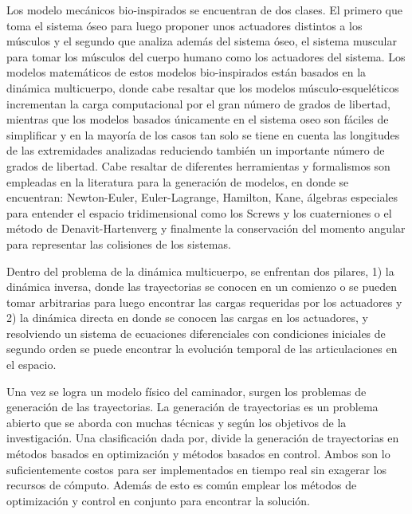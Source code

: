 Los modelo mec\'anicos bio-inspirados se encuentran de dos clases\cite{Xiang2010}. El primero que toma el sistema \'oseo para luego proponer unos actuadores distintos a los músculos\cite{Wang2012} y el segundo que analiza adem\'as del sistema \'oseo, el sistema muscular para tomar los m\'usculos del cuerpo humano como los actuadores del sistema\cite{Kang2013,Roa2006}. Los modelos matem\'aticos de estos modelos bio-inspirados est\'an basados en la din\'amica multicuerpo\cite{Xiang2010}, donde cabe resaltar que los modelos m\'usculo-esquel\'eticos incrementan la carga computacional por el gran n\'umero de grados de libertad\cite{Xiang2010}, mientras que los modelos basados \'unicamente en el sistema oseo son f\'aciles de simplificar y en la mayor\'ia de los casos tan solo se tiene en cuenta las longitudes de las extremidades analizadas reduciendo también un importante n\'umero de grados de libertad\cite{McGeer1990a}. Cabe resaltar de diferentes herramientas y formalismos son empleadas en la literatura para la generaci\'on de modelos, en donde se encuentran: Newton-Euler, Euler-Lagrange, Hamilton, Kane, \'algebras especiales para entender el espacio tridimensional como los Screws y los cuaterniones o el método de Denavit-Hartenverg y finalmente la conservaci\'on del momento angular para representar las colisiones de los sistemas.\par
Dentro del problema de la din\'amica multicuerpo, se enfrentan dos pilares, 1) la din\'amica inversa, donde las trayectorias se conocen en un comienzo o se pueden tomar arbitrarias para luego encontrar las cargas requeridas por los actuadores y 2) la din\'amica directa en donde se conocen las cargas en los actuadores, y resolviendo un sistema de ecuaciones diferenciales con condiciones iniciales de segundo orden se puede encontrar la evoluci\'on temporal de las articulaciones en el espacio.\par
Una vez se logra un modelo f\'isico del caminador, surgen los problemas de generaci\'on de las trayectorias. La generaci\'on de trayectorias es un problema abierto que se aborda con muchas t\'ecnicas y seg\'un los objetivos de la investigaci\'on\cite{Kherici2014,Mahmoodabadi2014}. Una clasificaci\'on dada por\cite{Xiang2010}, divide la generaci\'on de trayectorias en m\'etodos basados en optimizaci\'on y m\'etodos basados en control. Ambos son lo suficientemente costos para ser implementados en tiempo real sin exagerar los recursos de c\'omputo\cite{Mahmoodabadi2014}. Adem\'as de esto es com\'un emplear los m\'etodos de optimizaci\'on y control en conjunto para encontrar la soluci\'on.\par
